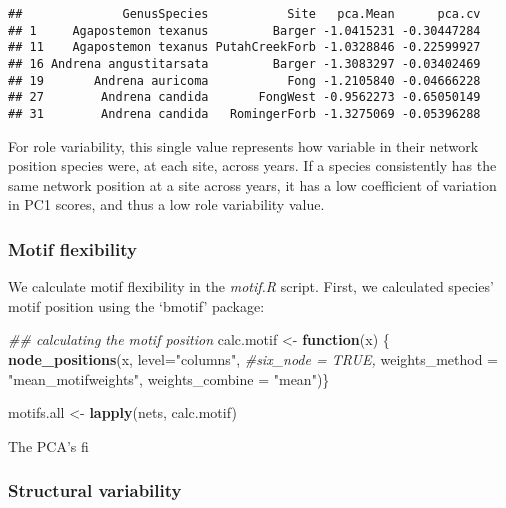 \documentclass[
]{article}
\newenvironment{Shaded}{\begin{snugshade}}{\end{snugshade}}
\newcommand{\CommentTok}[1]{\textcolor[rgb]{0.56,0.35,0.01}{\textit{#1}}}
\newcommand{\ControlFlowTok}[1]{\textcolor[rgb]{0.13,0.29,0.53}{\textbf{#1}}}
\newcommand{\DataTypeTok}[1]{\textcolor[rgb]{0.13,0.29,0.53}{#1}}
\newcommand{\KeywordTok}[1]{\textcolor[rgb]{0.13,0.29,0.53}{\textbf{#1}}}
\newcommand{\NormalTok}[1]{#1}
\newcommand{\StringTok}[1]{\textcolor[rgb]{0.31,0.60,0.02}{#1}}
\begin{document}
\begin{verbatim}
##              GenusSpecies           Site   pca.Mean      pca.cv
## 1     Agapostemon texanus         Barger -1.0415231 -0.30447284
## 11    Agapostemon texanus PutahCreekForb -1.0328846 -0.22599927
## 16 Andrena angustitarsata         Barger -1.3083297 -0.03402469
## 19       Andrena auricoma           Fong -1.2105840 -0.04666228
## 27        Andrena candida       FongWest -0.9562273 -0.65050149
## 31        Andrena candida   RomingerForb -1.3275069 -0.05396288
\end{verbatim}

For role variability, this single value represents how variable in their
network position species were, at each site, across years. If a species
consistently has the same network position at a site across years, it
has a low coefficient of variation in PC1 scores, and thus a low role
variability value.

\hypertarget{motif-flexibility}{%
\subsubsection{Motif flexibility}\label{motif-flexibility}}

We calculate motif flexibility in the \emph{motif.R} script. First, we
calculated species' motif position using the `bmotif' package:

\begin{Shaded}
\begin{Highlighting}[]
\CommentTok{\#\# calculating the motif position }
\NormalTok{calc.motif \textless{}{-}}\StringTok{ }\ControlFlowTok{function}\NormalTok{(x) \{}
  \KeywordTok{node\_positions}\NormalTok{(x, }\DataTypeTok{level=}\StringTok{"columns"}\NormalTok{, }
                           \CommentTok{\#six\_node = TRUE,}
                           \DataTypeTok{weights\_method =} \StringTok{"mean\_motifweights"}\NormalTok{, }
                           \DataTypeTok{weights\_combine =} \StringTok{"mean"}\NormalTok{)\}}

\NormalTok{motifs.all \textless{}{-}}\StringTok{ }\KeywordTok{lapply}\NormalTok{(nets, calc.motif)}
\end{Highlighting}
\end{Shaded}

The PCA's fi

\hypertarget{structural-variability}{%
\subsubsection{Structural variability}\label{structural-variability}}
\end{document}
